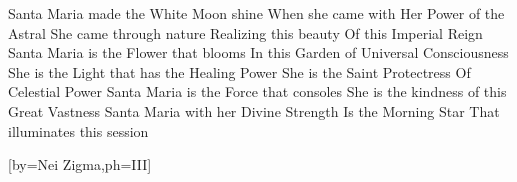   \begin{translation}
    Santa Maria made the White Moon shine
    When she came with Her Power of the Astral
    \nextverse
    She came through nature
    Realizing this beauty
    Of this Imperial Reign
    \nextverse
    Santa Maria is the Flower that blooms
    In this Garden of Universal Consciousness
    \nextverse
    She is the Light that has the Healing Power
    She is the Saint Protectress
    Of Celestial Power
    \nextverse
    Santa Maria is the Force that consoles
    She is the kindness of this Great Vastness
    \nextverse
    Santa Maria with her Divine Strength
    Is the Morning Star
    That illuminates this session
  \end{translation}
\endsong


\scleardpage
{}[by={Nei Zigma},ph={III}]
\]\]\]\]\]\]\]\]\]\]\]\]\]\]\]\]\]\]\]\]\]\]\]\]\]\]\]\]\]\]\]\]\]\]\]\]\]\]\]\]\]\]\]\]\]\]\]\]\]\]\]\]\]\]\]\]\]\]\]\]\]\]\]\]\]\]\]\]\]\]\]\]\]\]\]\]\]\]\]\]\]\]\]\]\]\]\]\]\]\]\]\]\]\]\]\]\]\]\]\]\]\]\]\]\]\]\]\]\]\]\]\]\]\]\]\]\]\]\]\]\]\]\]\]\]\]\]\]\]\]\]\]\]\]\]\]\]\]\]\]\]\]\]\]\]\]\]\]\]\]\]\]\]\]\]\]\]\]\]\]\]\]\]\]\]\]\]\]\]\]\]\]\]\]\]\]\]\]\]\]\]\]\]\]\]\]\]\]\]\]\]\]\]\]\]\]\]\]\]\]\]\]\]\]\]\]\]\]\]\]\]\]\]\]\]\]\]\]\]\]\]\]\]\]\]\]\]\]\]\]\]\]\]\]\]\]\]\]\]\]\]\]\]\]\]\]\]\]\]\]\]\]\]\]\]\]\]\]\]\]\]\]\]\]\]\]\]\]\]\]\]\]\]\]\]\]\]\]\]\]\]\]\]\]\]\]\]\]\]\]\]\]\]\]\]\]\]\]\]\]\]\]\]\]\]\]\]\]\]\]\]\]\]\]\]\]\]\]\]\]\]\]\]\]\]\]\]\]\]\]\]\]\]\]\]\]\]\]\]\]\]\]\]\]\]\]\]\]\]\]\]\]\]\]\]\]\]\]\]\]\]\]\]\]\]\]\]\]\]\]\]\]\]\]\]\]\]\]\]\]\]\]\]\]\]\]\]\]\]\]\]\]\]\]\]\]\]\]\]\]\]\]\]\]\]\]\]\]\]\]\]\]\]\]\]\]\]\]\]\]\]\]\]\]\]\]\]\]\]\]\]\]\]\]\]\]\]\]\]\]\]\]\]\]\]\]\]\]\]\]\]\]\]\]\]\]\]\]\]\]\]\]\]\]\]\]\]\]\]\]\]\]\]\]\]\]\]\]\]\]\]\]\]\]\]\]\]\]\]\]\]\]\]\]\]\]\]\]\]\]\]\]\]\]\]\]\]\]\]\]\]\]\]\]\]\]\]\]\]\]\]\]\]\]\]\]\]\]\]\]\]\]\]\]\]\]\]\]\]\]\]\]\]\]\]\]\]\]\]\]\]\]\]\]\]\]\]\]\]\]\]\]\]\]\]\]\]\]\]\]\]\]\]\]\]\]\]\]\]\]\]\]\]\]\]\]\]\]\]\]\]\]\]\]\]\]\]\]\]\]\]\]\]\]\]\]\]\]\]\]\]\]\]\]\]\]\]\]\]\]\]\]\]\]\]\]\]\]\]\]\]\]\]\]\]\]\]\]\]\]\]\]\]\]\]\]\]\]\]\]\]\]\]\]\]\]\]\]\]\]\]\]\]\]\]\]\]\]\]\]\]\]\]\]\]\]\]\]\]\]\]\]\]\]\]\]\]\]\]\]\]\]\]\]\]\]\]\]\]\]\]\]\]\]\]\]\]\]\]\]\]\]\]\]\]\]\]\]\]\]\]\]\]\]\]\]\]\]\]\]\]\]\]\]\]\]\]\]\]\]\]\]\]\]\]\]\]\]\]\]\]\]\]\]\]\]\]\]\]\]\]\]\]\]\]\]\]\]\]\]\]\]\]\]\]\]\]\]\]\]\]\]\]\]\]\]\]\]\]\]\]\]\]\]\]\]\]\]\]\]\]\]\]\]\]\]\]\]\]\]\]\]\]\]\]\]\]\]\]\]\]\]\]\]\]\]\]\]\]\]\]\]\]\]\]\]\]\]\]\]\]\]\]\]\]\]\]\]\]\]\]\]\]\]\]\]\]\]\]\]\]\]\]\]\]\]\]\]\]\]\]\]\]\]\]\]\]\]\]\]\]\]\]\]\]\]\]\]\]\]\]\]\]\]\]\]\]\]\]\]\]\]\]\]\]\]\]\]\]\]\]\]\]\]\]\]\]\]\]\]\]\]\]\]\]\]\]\]\]\]\]\]\]\]\]\]\]\]\]\]\]\]\]\]\]\]\]\]\]\]\]\]\]\]\]\]\]\]\]\]\]\]\]\]\]\]\]\]\]\]\]\]\]\]\]\]\]\]\]\]\]\]\]\]\]\]\]\]\]\]\]\]\]\]\]\]\]\]\]\]\]\]\]\]\]\]\]\]\]\]\]\]\]\]\]\]\]\]\]\]\]\]\]\]\]\]\]\]\]\]\]\]\]\]\]\]\]\]\]\]\]\]\]\]\]\]\]\]\]\]\]\]\]\]\]\]\]\]\]\]\]\]\]\]\]\]\]\]\]\]\]\]\]\]\]\]\]\]\]\]\]\]\]\]\]\]\]\]\]\]\]\]\]\]\]\]\]\]\]\]\]\]\]\]\]\]\]\]\]\]\]\]\]\]\]\]\]\]\]\]\]\]\]\]\]\]\]\]\]\]\]\]\]\]\]\]\]\]\]\]\]\]\]\]\]\]\]\]\]\]\]\]\]\]\]\]\]\]\]\]\]\]\]\]\]\]\]\]\]\]\]\]\]\]\]\]\]\]\]\]\]\]\]\]\]\]\]\]\]\]\]\]\]\]\]\]\]\]\]\]\]\]\]\]\]\]\]\]\]\]\]\]\]\]\]\]\]\]\]\]\]
